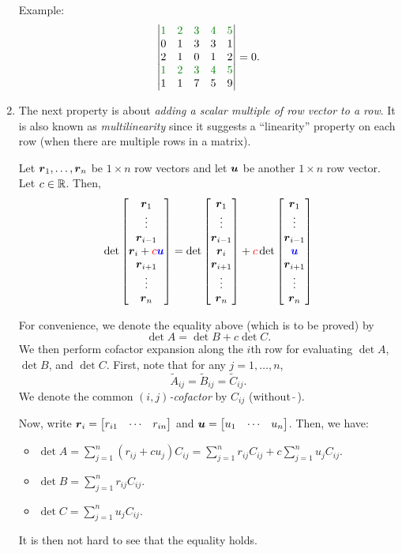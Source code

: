 \begin{enumerate}
Example:
\[
\mqty|\gc{1}&\gc{2}&\gc{3}&\gc{4}&\gc{5}\\ 0&1&3&3&1\\ 2&1&0&1&2\\ \gc{1}&\gc{2}&\gc{3}&\gc{4}&\gc{5}\\ 1&1&7&5&9|
=0.
\]

\item The next property is about \emph{adding a scalar multiple of row vector
to a row}. It is also known as \emph{multilinearity} since it suggests a
``linearity'' property on each row (when there are multiple rows in a matrix).
\begin{proposition}[Multilinearity]
\label{prp:det-multilinear}
Let \(\vb*{r}_{1},\dotsc,\vb*{r}_{n}\) be \(1\times n\) row vectors and let
\(\vb*{u}\) be another \(1\times n\) row vector. Let \(c\in\mathbb{R}\). Then,
\[
\det\mqty[\vect{r}_{1}\\\vdots\\ \vect{r}_{i-1}\\ \vect{r}_{i}+\rc{c}\blc{\vect{u}}\\
\vect{r}_{i+1}\\ \vdots\\ \vect{r}_{n}]
=
\det\mqty[\vect{r}_{1}\\\vdots\\ \vect{r}_{i-1}\\ \vect{r}_{i}\\
\vect{r}_{i+1}\\ \vdots\\ \vect{r}_{n}]
+\rc{c}\det\mqty[\vect{r}_{1}\\\vdots\\ \vect{r}_{i-1}\\ \blc{\vect{u}}\\
\vect{r}_{i+1}\\ \vdots\\ \vect{r}_{n}]
\]
\end{proposition}
\begin{pf}
For convenience, we denote the equality above (which is to be proved) by
\[
\det A=\det B+c\det C.
\]
We then perform cofactor expansion along the \(i\)th row for evaluating \(\det
A\), \(\det B\), and \(\det C\). First, note that for any \(j=1,\dotsc,n\),
\[
\widetilde{A}_{ij}=\widetilde{B}_{ij}=\widetilde{C}_{ij}.
\]
We denote the common \emph{\((i,j)\)-cofactor} by \(C_{ij}\) (without
\(\widetilde{\;}\)).

Now, write \(\vect{r}_{i}=\mqty[r_{i1}&\cdots&r_{in}]\) and
\(\vect{u}=\mqty[u_1&\cdots&u_n]\). Then, we have:
\begin{itemize}
\item \(\displaystyle \det A=\sum_{j=1}^{n}(r_{ij}+cu_{j})C_{ij}=\sum_{j=1}^{n}r_{ij}C_{ij}+c\sum_{j=1}^{n}u_{j}C_{ij}.\)
\item \(\displaystyle \det B=\sum_{j=1}^{n}r_{ij}C_{ij}.\)
\item \(\displaystyle \det C=\sum_{j=1}^{n}u_{j}C_{ij}.\)
\end{itemize}
It is then not hard to see that the equality holds.
\end{pf}


\end{enumerate}
